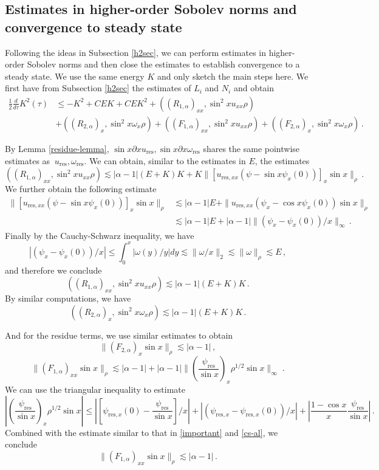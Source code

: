 \documentclass[12pt]{caltech_thesis}
\numberwithin{equation}{section}
\begin{document}
 \subsection{Estimates in higher-order Sobolev norms and convergence to steady state}
 Following the ideas in Subsection \ref{h2sec}, we can perform estimates in higher-order Sobolev norms and then close the estimates to establish  convergence to a steady state. We use the same energy $K$ and only sketch the main steps here. We first have from Subsection \ref{h2sec} the estimates of $L_i$ and $N_i$ and obtain
$$\begin{aligned}
\frac{1}{2}\frac{d}{d\tau}K^2(\tau)&\leq -K^2+CEK+CEK^2+((R_{1,\alpha})_{xx},\sin^2x u_{xx}\rho)\\&+((R_{2,\alpha})_x,\sin^2x\omega_x \rho)+((F_{1,\alpha})_{xx},\sin^2xu_{xx}\rho)+((F_{2,\alpha})_x,\sin^2x\omega_x\rho)\,.
\end{aligned}$$

By Lemma \ref{residue-lemma}, $\sin x\partial x u_{\text{res}}, \sin x\partial x \omega_{\text{res}}$ shares the same pointwise estimates as $\ u_{\text{res}},  \omega_{\text{res}}$. We can obtain, similar to the estimates in $E$, the estimates $$((R_{1,\alpha})_{xx},\sin^2x u_{xx}\rho)\lesssim|\alpha-1|(E+K)K+K\|[u_{\text{res},xx}(\psi-\sin x\psi_x(0))]_x\sin x\|_{\rho}\,.$$
We further obtain the following estimate $$\begin{aligned}
    \|[u_{\text{res},xx}(\psi-\sin x\psi_x(0))]_x\sin x\|_{\rho}&\lesssim |\alpha-1|E+\|u_{\text{res},xx}(\psi_x-\cos x\psi_x(0))\sin x\|_{\rho}\\&\lesssim |\alpha-1|E+|\alpha-1|\|(\psi_x-\psi_x(0))/x\|_{\infty}\,.
\end{aligned}$$
Finally by the Cauchy-Schwarz inequality,
we have 
\begin{equation}
    \label{cs-al}|(\psi_x-\psi_x(0))/x|\leq\int_{0}^x|\omega(y)/y|dy\lesssim\|\omega/x\|_{2}\lesssim\|\omega\|_{\rho}\lesssim E\,,
\end{equation}
and therefore we conclude $$((R_{1,\alpha})_{xx},\sin^2x u_{xx}\rho)\lesssim|\alpha-1|(E+K)K\,.$$
By similar computations, we have 
$$((R_{2,\alpha})_{x},\sin^2x \omega_{x}\rho)\lesssim|\alpha-1|(E+K)K\,.$$

And for the residue terms, we use similar estimates to obtain
$$\|(F_{2,\alpha})_x\sin x\|_{\rho}\lesssim|\alpha-1|\,,$$
$$  \|(F_{1,\alpha})_{xx}\sin x\|_{\rho}\lesssim|\alpha-1|+|\alpha-1|\|(\frac{\psi_{\text{res}}}{\sin x})_x\rho^{1/2}\sin x\|_{\infty}\;.$$
We can use the triangular inequality to estimate $$|(\frac{\psi_{\text{res}}}{\sin x})_x\rho^{1/2}\sin x|\leq |[\psi_{\text{res},x}(0)-\frac{\psi_\text{res}}{\sin x}]/x|+|(\psi_{\text{res},x}-\psi_{\text{res},x}(0))/x|+|\frac{1-\cos x}{x}\frac{\psi_\text{res}}{\sin x}|\,.$$
Combined with the estimate similar to that in \eqref{important} and \eqref{cs-al}, we conclude $$  \|(F_{1,\alpha})_{xx}\sin x\|_{\rho}\lesssim|\alpha-1|\,.$$
\end{document}
